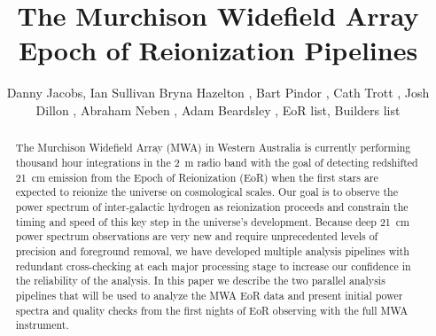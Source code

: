 \documentclass[preprint2]{aastex}
\begin{document}

\title{The Murchison Widefield Array Epoch of Reionization Pipelines}


\author{
Danny Jacobs,
Ian Sullivan 
Bryna Hazelton ,
Bart Pindor ,
Cath Trott ,
Josh Dillon ,
Abraham Neben ,
Adam Beardsley ,
EoR list,
Builders list
}
\begin{abstract}
The Murchison Widefield Array (MWA) in Western Australia is currently
performing thousand hour integrations in the 2~m radio band with the
goal of detecting redshifted 21~cm emission from the Epoch of
Reionization (EoR) when the first stars are expected to reionize the
universe on cosmological scales. Our goal is to observe the power
spectrum of inter-galactic hydrogen as reionization proceeds and
constrain the timing and speed of this key step in the universe's
development. Because deep 21~cm power spectrum observations are very new
and require unprecedented levels of precision and foreground removal, we
have developed multiple analysis pipelines with redundant cross-checking
at each major processing stage to increase our confidence in the
reliability of the analysis. In this paper we describe the two parallel
analysis pipelines that will be used to analyze the MWA EoR data and
present initial power spectra and quality checks from the first nights
of EoR observing with the full MWA instrument.

\end{abstract}




\end{document}
